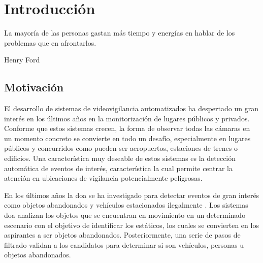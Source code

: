 
\chapter{Introducción}
\label{cha:introduccion}

\begin{FraseCelebre}
  \begin{Frase}
    La mayoría de las personas gastan más tiempo y energías en hablar de los problemas que en afrontarlos.
  \end{Frase}
  \begin{Fuente}
    Henry Ford
  \end{Fuente}
\end{FraseCelebre}

\section{Motivación}
\label{sec:motivacion}

El desarrollo de sistemas de videovigilancia automatizados ha despertado un gran interés en los últimos años en la monitorización de lugares públicos y privados. Conforme que estos sistemas crecen, la forma de observar todas las cámaras en un momento concreto se convierte en todo un desafío, especialmente en lugares públicos y concurridos como pueden ser aeropuertos, estaciones de trenes o edificios. Una característica muy deseable de estos sistemas es la detección automática de eventos de interés, característica la cual permite centrar la atención en ubicaciones de vigilancia potencialmente peligrosas.

En los últimos años la \gls{doa} se ha investigado para detectar eventos de gran interés como objetos abandonados \cite{filonenko2016unattended} y vehículos estacionados ilegalmente \cite{Wahyono2017CumulativeDF}. Los sistemas \gls{doa} analizan los objetos que se encuentran en movimiento en un determinado escenario con el objetivo de identificar los estáticos, los cuales se convierten en los aspirantes a ser objetos abandonados. Posteriormente, una serie de pasos de filtrado validan a los candidatos para determinar si son vehículos, personas u objetos abandonados.

